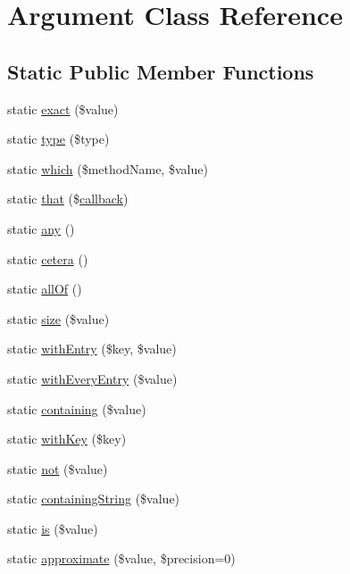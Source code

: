 \hypertarget{class_prophecy_1_1_argument}{}\section{Argument Class Reference}
\label{class_prophecy_1_1_argument}
\subsection*{Static Public Member Functions}
\begin{DoxyCompactItemize}
\item 
static \mbox{\hyperlink{class_prophecy_1_1_argument_af5996abc227f6270f8593f56a3bfe8aa}{exact}} (\$value)
\item 
static \mbox{\hyperlink{class_prophecy_1_1_argument_ab1d400a505a0a37507d931b8feba7804}{type}} (\$type)
\item 
static \mbox{\hyperlink{class_prophecy_1_1_argument_a687f0c1c1d42a06901f4f4fb58d766f3}{which}} (\$method\+Name, \$value)
\item 
static \mbox{\hyperlink{class_prophecy_1_1_argument_a1ebac03303e1d9aeaa8d91a15e55c00f}{that}} (\$\mbox{\hyperlink{_functions_8php_ae2242eb47799ca6a822b022dc1bd1ac9}{callback}})
\item 
static \mbox{\hyperlink{class_prophecy_1_1_argument_a8347b85f5dc642279e508472941836f2}{any}} ()
\item 
static \mbox{\hyperlink{class_prophecy_1_1_argument_a03c8de4418e8b1fc6454840091c6092a}{cetera}} ()
\item 
static \mbox{\hyperlink{class_prophecy_1_1_argument_aff73b09379cb974e50f38eb63fb516d4}{all\+Of}} ()
\item 
static \mbox{\hyperlink{class_prophecy_1_1_argument_a4619ddd02c1b903f3830cbe33d886c3d}{size}} (\$value)
\item 
static \mbox{\hyperlink{class_prophecy_1_1_argument_a51f4257e8c9dfff17521475c23b3a4fc}{with\+Entry}} (\$key, \$value)
\item 
static \mbox{\hyperlink{class_prophecy_1_1_argument_a46805531996985beb23c8d6fa6c2fb7f}{with\+Every\+Entry}} (\$value)
\item 
static \mbox{\hyperlink{class_prophecy_1_1_argument_aaca8ed069c331e41bbc7d9853be36066}{containing}} (\$value)
\item 
static \mbox{\hyperlink{class_prophecy_1_1_argument_a574bf7d3db2beab5c408889345ac9656}{with\+Key}} (\$key)
\item 
static \mbox{\hyperlink{class_prophecy_1_1_argument_a51deeacf7979333a7c4cc80a390252b4}{not}} (\$value)
\item 
static \mbox{\hyperlink{class_prophecy_1_1_argument_a09d9db103ffc22f4be2e66104f57e488}{containing\+String}} (\$value)
\item 
static \mbox{\hyperlink{class_prophecy_1_1_argument_a938d0098a841a76a6280ced240543563}{is}} (\$value)
\item 
static \mbox{\hyperlink{class_prophecy_1_1_argument_a827d500b9d14af4dc4e061a584fbb900}{approximate}} (\$value, \$precision=0)
\end{DoxyCompactItemize}


